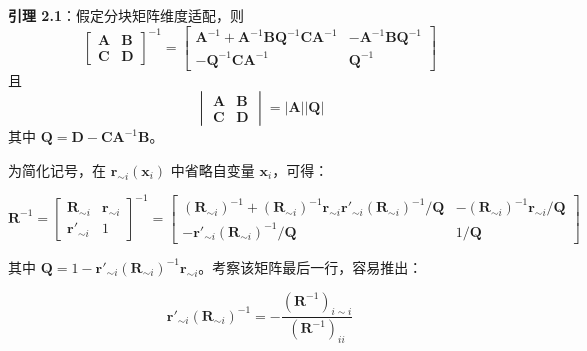 \documentclass{ctexart}
\begin{document}
\begin{mdquote}
\textbf{引理 2.1}：假定分块矩阵维度适配，则 \begin{equation*}
\begin{bmatrix}\boldsymbol{A}&\boldsymbol{B}\\\boldsymbol{C}&\boldsymbol{D}\end{bmatrix}^{-1}=\begin{bmatrix}\boldsymbol{A}^{-1}+\boldsymbol{A}^{-1}\boldsymbol{B}\boldsymbol{Q}^{-1}\boldsymbol{C}\boldsymbol{A}^{-1}&-\boldsymbol{A}^{-1}\boldsymbol{B}\boldsymbol{Q}^{-1}\\-\boldsymbol{Q}^{-1}\boldsymbol{C}\boldsymbol{A}^{-1}&\boldsymbol{Q}^{-1}\end{bmatrix}
\end{equation*} 且 \begin{equation*}
\begin{vmatrix}\boldsymbol{A}&\boldsymbol{B}\\\boldsymbol{C}&\boldsymbol{D}\end{vmatrix}=|\boldsymbol{A}||\boldsymbol{Q}|
\end{equation*} 其中 $\boldsymbol{Q}=\boldsymbol{D}-\boldsymbol{C}\boldsymbol{A}^{-1}\boldsymbol{B}$。
\end{mdquote}

为简化记号，在 $\boldsymbol{r}_{\sim i}(\boldsymbol{x}_i)$ 中省略自变量 $\boldsymbol{x}_i$，可得：

\begin{equation*}
\boldsymbol{R}^{-1}=
\begin{bmatrix}
\boldsymbol{R}_{\sim i}&\boldsymbol{r}_{\sim i}\\
\boldsymbol{r}'_{\sim i}&1
\end{bmatrix}^{-1}=\begin{bmatrix}
(\boldsymbol{R}_{\sim i})^{-1}+(\boldsymbol{R}_{\sim i})^{-1}\boldsymbol{r}_{\sim i}\boldsymbol{r}'_{\sim i}(\boldsymbol{R}_{\sim i})^{-1}/\boldsymbol{Q}&-(\boldsymbol{R}_{\sim i})^{-1}\boldsymbol{r}_{\sim i}/\boldsymbol{Q}\\
-\boldsymbol{r}'_{\sim i}(\boldsymbol{R}_{\sim i})^{-1}/\boldsymbol{Q}&1/\boldsymbol{Q}
\end{bmatrix}
\end{equation*}

其中 $\boldsymbol{Q}=1-\boldsymbol{r}'_{\sim i}(\boldsymbol{R}_{\sim i})^{-1}\boldsymbol{r}_{\sim i}$。考察该矩阵最后一行，容易推出：

\begin{equation*}
\boldsymbol{r}'_{\sim i}(\boldsymbol{R}_{\sim i})^{-1}=-\frac{(\boldsymbol{R}^{-1})_{i\sim i}}{(\boldsymbol{R}^{-1})_{ii}}
\end{equation*}
\end{document}
